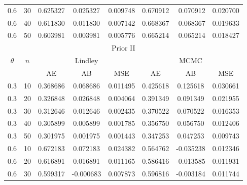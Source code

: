 \documentclass[11pt,a4paper]{article}
\numberwithin{equation}{section}
\begin{document}
\begin{table}[htbp]
\begin{tabular}{cc|ccc|ccc}
			0.6   & 30    & 0.625327 & 0.025327 & 0.009748 & \multicolumn{1}{r}{0.670912} & \multicolumn{1}{r}{0.070912} & \multicolumn{1}{r}{0.020700} \\

			0.6   & 40    & 0.611830 & 0.011830 & 0.007142 & \multicolumn{1}{r}{0.668367} & \multicolumn{1}{r}{0.068367} & \multicolumn{1}{r}{0.019633} \\

			0.6   & 50    & 0.603981 & 0.003981 & 0.005776 & \multicolumn{1}{r}{0.665214} & \multicolumn{1}{r}{0.065214} & \multicolumn{1}{r}{0.018427} \\

			\midrule

			\multicolumn{8}{c}{Prior II} \\

			\midrule

			\multirow{2}[4]{*}{$\theta$} & \multirow{2}[4]{*}{$n$} & \multicolumn{3}{c|}{Lindley} & \multicolumn{3}{c}{MCMC} \\

			\cmidrule{3-8}           &       & \multicolumn{1}{c|}{AE} & \multicolumn{1}{c|}{AB} & MSE   & \multicolumn{1}{c|}{AE} & \multicolumn{1}{c|}{AB} & \multicolumn{1}{c|}{MSE} \\

			\midrule

			0.3   & 10    & 0.368686 & 0.068686 & 0.011495 & 0.425618 & 0.125618 & 0.030661 \\

			0.3   & 20    & 0.326848 & 0.026848 & 0.004064 & 0.391349 & 0.091349 & 0.021955 \\

			0.3   & 30    & 0.312646 & 0.012646 & 0.002435 & 0.370522 & 0.070522 & 0.016353 \\

			0.3   & 40    & 0.305899 & 0.005899 & 0.001785 & 0.356750 & 0.056750 & 0.012406 \\

			0.3   & 50    & 0.301975 & 0.001975 & 0.001443 & 0.347253 & 0.047253 & 0.009743 \\

			0.6   & 10    & 0.672183 & 0.072183 & 0.024382 & 0.564762 & -0.035238 & 0.012346 \\

			0.6   & 20    & 0.616891 & 0.016891 & 0.011165 & 0.586416 & -0.013585 & 0.011931 \\

			0.6   & 30    & 0.599317 & -0.000683 & 0.007873 & 0.596816 & -0.003184 & 0.011744 \\


\end{tabular}
\end{table}
\end{document}
